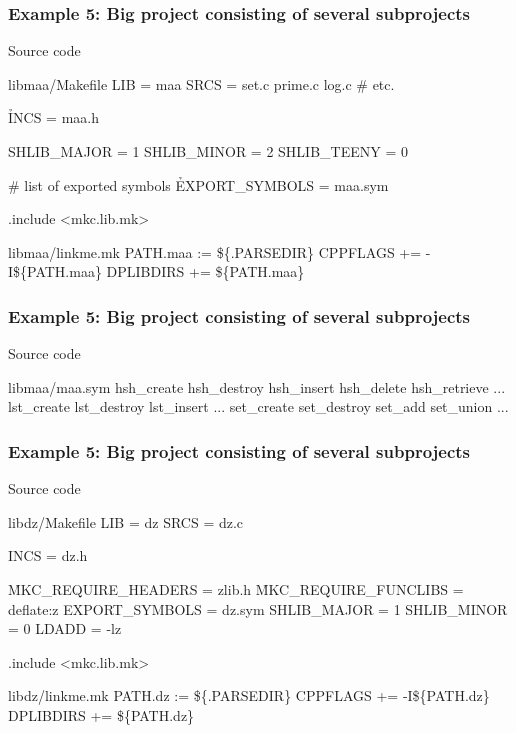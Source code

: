 \documentclass[hyperref={colorlinks=true}]{beamer}
\begin{document}
\begin{frame}[fragile]
  \frametitle{Example 5: Big project consisting of several subprojects}

  \begin{block}{Source code}
  \begin{Code}{libmaa/Makefile}
LIB =       maa
SRCS =      set.c prime.c log.c # etc.

\h{INCS} =      maa.h

SHLIB_MAJOR =    1
SHLIB_MINOR =    2
SHLIB_TEENY =    0

# list of exported symbols
\h{EXPORT\_SYMBOLS} = maa.sym

.include <mkc.lib.mk>
  \end{Code}
  \begin{Code}{libmaa/linkme.mk}
PATH.maa :=      \$\{.PARSEDIR\}
CPPFLAGS +=      -I\$\{PATH.maa\}
DPLIBDIRS +=     \$\{PATH.maa\}
  \end{Code}
  \end{block}
\end{frame}

\begin{frame}[fragile]
  \frametitle{Example 5: Big project consisting of several subprojects}

  \begin{block}{Source code}
  \begin{Code}{libmaa/maa.sym}
hsh_create
hsh_destroy
hsh_insert
hsh_delete
hsh_retrieve
...
lst_create
lst_destroy
lst_insert
...
set_create
set_destroy
set_add
set_union
...
  \end{Code}
  \end{block}
\end{frame}

\begin{frame}[fragile]
  \frametitle{Example 5: Big project consisting of several subprojects}

  \begin{block}{Source code}
  \begin{Code}{libdz/Makefile}
LIB =            dz
SRCS =           dz.c

INCS =           dz.h

\h{MKC\_REQUIRE\_HEADERS} =    zlib.h
\h{MKC\_REQUIRE\_FUNCLIBS} =   deflate:z
EXPORT_SYMBOLS =         dz.sym
SHLIB_MAJOR =            1
SHLIB_MINOR =            0
LDADD =                  -lz

.include <mkc.lib.mk>
  \end{Code}
  \begin{Code}{libdz/linkme.mk}
PATH.dz :=       \$\{.PARSEDIR\}
CPPFLAGS +=      -I\$\{PATH.dz\}
DPLIBDIRS +=     \$\{PATH.dz\}
  \end{Code}
  \end{block}
\end{frame}
\end{document}
